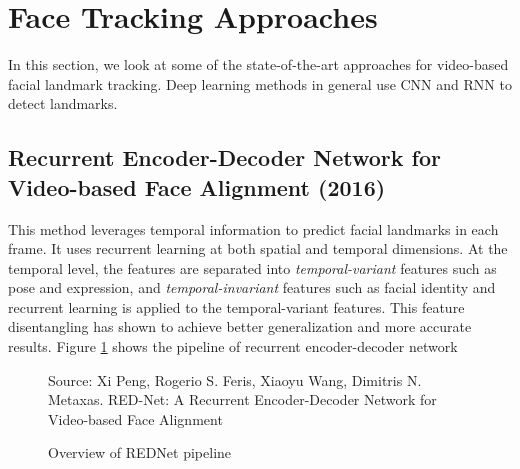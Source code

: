 \documentclass{llncs}
\begin{document}
\begin{table}[htbp]
\begin{tabular}{|l|l|l|l|l|}
\end{tabular}
\label{datasets}
\end{table}

\section{Face Tracking Approaches}

In this section, we look at some of the state-of-the-art approaches for video-based facial landmark tracking. Deep learning methods in general use CNN and RNN to detect landmarks.
\subsection{Recurrent Encoder-Decoder Network for Video-based Face Alignment (2016) \cite{rednet}}

This method leverages temporal information to predict facial landmarks in each frame. It uses recurrent learning at both spatial and temporal dimensions. At the temporal level, the features are separated into \textit{temporal-variant} features such as pose and expression, and \textit{temporal-invariant} features such as facial identity and recurrent learning is applied to the temporal-variant features. This feature disentangling has shown to achieve better generalization and more accurate results. Figure \ref{rednet_architecture} shows the pipeline of recurrent encoder-decoder network \\

\begin{figure}
%
{Source: Xi Peng, Rogerio S. Feris, Xiaoyu Wang, Dimitris N. Metaxas. RED-Net: A Recurrent Encoder-Decoder Network for Video-based Face Alignment}
\caption{Overview of REDNet pipeline}
\label{rednet_architecture}
\end{figure}
\end{document}
